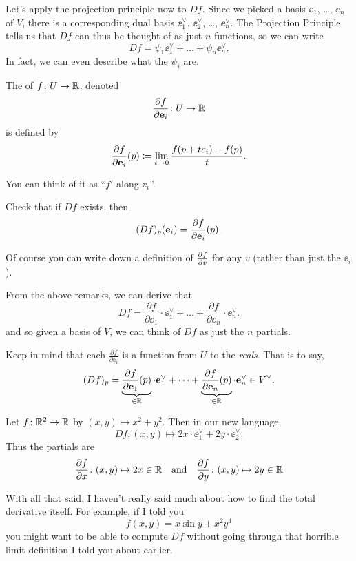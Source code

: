 Let's apply the projection principle now to $Df$.
Since we picked a basis $\ee_1$, \dots, $\ee_n$ of $V$,
there is a corresponding dual basis
$\ee_1^\vee$, $\ee_2^\vee$, \dots, $\ee_n^\vee$.
The Projection Principle tells us that $Df$ can thus be thought of as just $n$ functions, so we can write
\[ Df = \psi_1 \ee_1^\vee + \dots + \psi_n \ee_n^\vee.  \]
In fact, we can even describe what the $\psi_i$ are.
\begin{definition}
	The  of $f \colon U \to \mathbb R$, denoted
	\[ \frac{\partial f}{\partial \mathbf e_i} \colon U \to \mathbb R \]
	is defined by
	\[
		\frac{\partial f}{\partial \mathbf e_i} (p)
		\coloneqq \lim_{t \to 0} \frac{f(p + te_i) - f(p)}{t}.
	\]
\end{definition}
You can think of it as ``$f'$ along $\ee_i$''.
\begin{ques}
	Check that if $Df$ exists, then \[ (Df)_p(\mathbf e_i) = \frac{\partial f}{\partial \mathbf e_i}(p). \]
\end{ques}
\begin{remark}
	Of course you can write down a definition of $\frac{\partial f}{\partial v}$
	for any $v$ (rather than just the $\ee_i$).
\end{remark}

From the above remarks, we can derive that
\[
	\boxed{
	Df =
	\frac{\partial f}{\partial \ee_1} \cdot \ee_1^\vee
	+ \dots +
	\frac{\partial f}{\partial \ee_n} \cdot \ee_n^\vee .
	}
\]
and so given a basis of $V$, we can think of $Df$ as just
the $n$ partials.
\begin{remark}
Keep in mind that each $\frac{\partial f}{\partial \ee_i}$ is a function from $U$ to the \emph{reals}.
That is to say,
\[
	(Df)_p =
	\underbrace{\frac{\partial f}{\partial \mathbf e_1}(p)}_{\in \mathbb R} \cdot \mathbf e_1^\vee
	+ \dots +
	\underbrace{\frac{\partial f}{\partial \mathbf e_n}(p)}_{\in \mathbb R} \cdot \mathbf e_n^\vee
	\in V^\vee.
\]
\end{remark}


\begin{example}[Partial derivatives of $f(x,y) = x^2+y^2$]
	Let $f \colon \mathbb R^2 \to \mathbb R$ by $(x,y) \mapsto x^2+y^2$.
	Then in our new language,
	\[ Df \colon (x,y) \mapsto 2x \cdot \ee_1^\vee + 2y \cdot \ee_2^\vee. \]
	Thus the partials are
	\[
		\frac{\partial f}{\partial x} \colon (x,y) \mapsto 2x \in \mathbb R
		\quad\text{and}\quad
		\frac{\partial f}{\partial y} \colon (x,y) \mapsto 2y \in \mathbb R
	\]
\end{example}

With all that said, I haven't really said much about how to
find the total derivative itself.
For example, if I told you
\[ f(x,y) = x \sin y + x^2y^4 \]
you might want to be able to compute $Df$ without going through
that horrible limit definition I told you about earlier.

